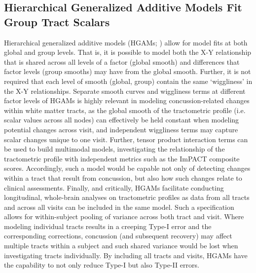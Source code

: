 \documentclass[12pt]{article}
\begin{document}
\subsection{Hierarchical Generalized Additive Models Fit Group Tract Scalars}
\label{ssec:meth-gam}
Hierarchical generalized additive models (HGAMs; \cite{pedersen2019HierarchicalGeneralizedAdditive}) allow for model fits at both global and group levels. That is, it is possible to model both the X-Y relationship that is shared across all levels of a factor (global smooth) and differences that factor levels (group smooths) may have from the global smooth. Further, it is not required that each level of smooth (global, group) contain the same `wiggliness' in the X-Y relationships. Separate smooth curves and wiggliness terms at different factor levels of HGAMs is highly relevant in modeling concussion-related changes within white matter tracts, as the global smooth of the tractometric profile (i.e. scalar values across all nodes) can effectively be held constant when modeling potential changes across visit, and independent wiggliness terms may capture scalar changes unique to one visit. Further, tensor product interaction terms can be used to build multimodal models, investigating the relationship of the tractometric profile with independent metrics such as the ImPACT composite scores. Accordingly, such a model would be capable not only of detecting changes within a tract that result from concussion, but also how such changes relate to clinical assessments. Finally, and critically, HGAMs facilitate conducting longitudinal, whole-brain analyses on tractometric profiles as data from all tracts and across all visits can be included in the same model. Such a specification allows for within-subject pooling of variance across both tract and visit. Where modeling individual tracts results in a creeping Type-I error and the corresponding corrections, concussion (and subsequent recovery) may affect multiple tracts within a subject and such shared variance would be lost when investigating tracts individually. By including all tracts and visits, HGAMs have the capability to not only reduce Type-I but also Type-II errors.
\end{document}
